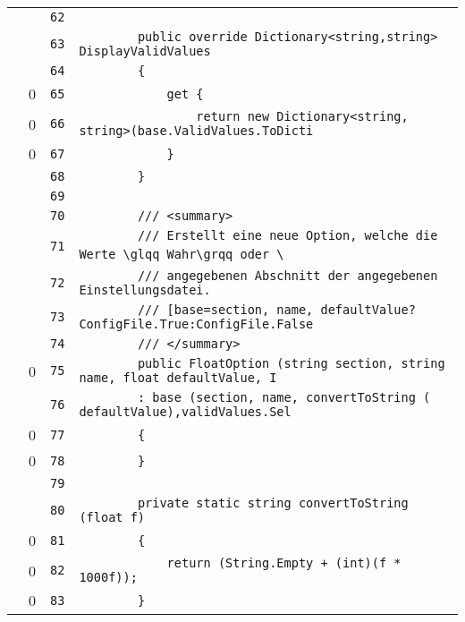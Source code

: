 \documentclass[a4paper,10pt]{article}
\begin{document}
\begin{longtable}[l]{lrrl}
\cellcolor{gray} &  & \verb~62~ & \verb~~\\
\cellcolor{gray} &  & \verb~63~ & \verb~        public override Dictionary<string,string> DisplayValidValues~\\
\cellcolor{gray} &  & \verb~64~ & \verb~        {~\\
\cellcolor{red} & 0 & \verb~65~ & \verb~            get {~\\
\cellcolor{red} & 0 & \verb~66~ & \verb~                return new Dictionary<string, string>(base.ValidValues.ToDicti~\\
\cellcolor{red} & 0 & \verb~67~ & \verb~            }~\\
\cellcolor{gray} &  & \verb~68~ & \verb~        }~\\
\cellcolor{gray} &  & \verb~69~ & \verb~~\\
\cellcolor{gray} &  & \verb~70~ & \verb~        /// <summary>~\\
\cellcolor{gray} &  & \verb~71~ & \verb~        /// Erstellt eine neue Option, welche die Werte \glqq Wahr\grqq oder \~\\
\cellcolor{gray} &  & \verb~72~ & \verb~        /// angegebenen Abschnitt der angegebenen Einstellungsdatei.~\\
\cellcolor{gray} &  & \verb~73~ & \verb~        /// [base=section, name, defaultValue?ConfigFile.True:ConfigFile.False~\\
\cellcolor{gray} &  & \verb~74~ & \verb~        /// </summary>~\\
\cellcolor{red} & 0 & \verb~75~ & \verb~        public FloatOption (string section, string name, float defaultValue, I~\\
\cellcolor{gray} &  & \verb~76~ & \verb~        : base (section, name, convertToString ( defaultValue),validValues.Sel~\\
\cellcolor{red} & 0 & \verb~77~ & \verb~        {~\\
\cellcolor{red} & 0 & \verb~78~ & \verb~        }~\\
\cellcolor{gray} &  & \verb~79~ & \verb~~\\
\cellcolor{gray} &  & \verb~80~ & \verb~        private static string convertToString (float f)~\\
\cellcolor{red} & 0 & \verb~81~ & \verb~        {~\\
\cellcolor{red} & 0 & \verb~82~ & \verb~            return (String.Empty + (int)(f * 1000f));~\\
\cellcolor{red} & 0 & \verb~83~ & \verb~        }~\\

\end{longtable}
\end{document}
